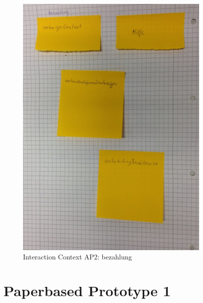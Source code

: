 \begin{figure}[H]
\centering
\includegraphics[angle=90, width=0.85\textwidth] {./images/abstract/version2/bezahlung.JPG}
\caption{Interaction Context AP2: bezahlung}
\label{interfaceContents52}
\end{figure}


\chapter{Paperbased Prototype 1}

